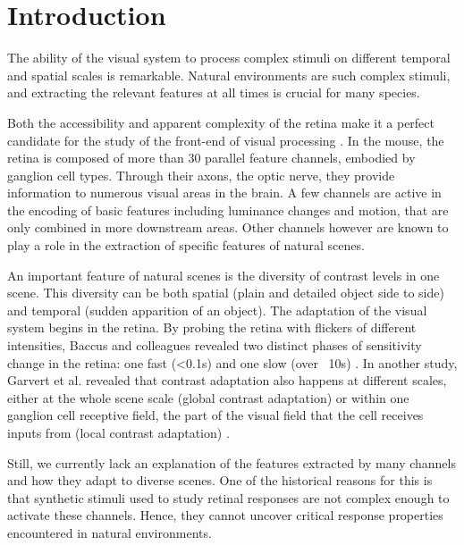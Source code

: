 \section{Introduction}\label{sec:introduction}

The ability of the visual system to process complex stimuli on different
temporal and spatial scales is remarkable.
Natural environments are such complex stimuli, and extracting the relevant
features at all times is crucial for many species.

Both the accessibility and apparent complexity	of the retina make it a
perfect candidate for the study of the front-end of visual processing
\citep{gollisch_eye_2010}. In the mouse, the retina is composed of more
than 30 parallel feature channels, embodied by ganglion cell types. Through
their axons, the optic nerve, they provide information to numerous visual areas
in the brain. %
A few channels are active in the encoding of basic features including luminance
changes and motion, that are only combined in more downstream areas. Other
channels however are known to play a role in the extraction of specific
features of natural scenes.

An important feature of natural scenes is the diversity of contrast levels in
one scene. This diversity can be both spatial (plain and detailed object side
to side) and temporal (sudden apparition of an object). The
adaptation of the visual system begins in the retina. By probing the retina with flickers of
different intensities, Baccus and colleagues revealed two distinct phases of
sensitivity change in the retina: one fast (<0.1s) and one slow (over ~10s)
\citep{baccus_fast_2002}.
In another study, Garvert et al. revealed that contrast adaptation also
happens at different scales, either at the whole scene scale (global contrast
adaptation) or within one ganglion cell receptive field, the part of the visual
field that the cell receives inputs from (local contrast adaptation)
\citep{garvert_local_2013}.

Still, we currently lack an explanation of the features extracted by many
channels and how they adapt to diverse scenes. One of the historical
reasons for this is that synthetic stimuli used
to study retinal responses are not complex enough to activate these channels.
Hence, they cannot uncover critical response properties encountered in natural
environments. %

